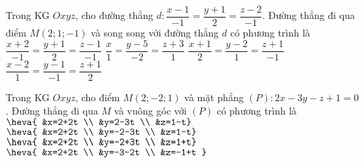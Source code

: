 \begin{ex}%
	Trong KG $Oxyz$, cho đường thẳng $d\colon \dfrac{x-1}{-1}=\dfrac{y+1}{2}=\dfrac{z-2}{-1}$. Đường thẳng đi qua điểm $M(2; 1;-1)$ và song song với đường thẳng $d$ có phương trình là
	\choice
	{$\dfrac{x+2}{-1}=\dfrac{y+1}{2}=\dfrac{z-1}{-1}$}
	{\True $\dfrac{x}{1}=\dfrac{y-5}{-2}=\dfrac{z+3}{1}$}
	{$\dfrac{x+1}{2}=\dfrac{y-2}{1}=\dfrac{z+1}{-1}$}
	{$\dfrac{x-2}{1}=\dfrac{y-1}{-1}=\dfrac{z+1}{2}$}
\end{ex}
\begin{ex}%
	Trong KG $Oxyz$, cho điểm $M(2;-2; 1)$ và mặt phẳng $(P)\colon 2x-3y-z+1=0$. Đường thẳng đi qua $M$ và vuông góc với $(P)$ có phương trình là
	\choice
	{$\heva{	&x=2+2t \\
			&y=2-3t \\
			&z=1-t}$}
	{\True $\heva{	&x=2+2t \\
			&y=-2-3t \\
			&z=1-t}$}
	{$\heva{	&x=2+2t \\
			&y=-2+3t \\
			&z=1+t}$}
	{$\heva{	&x=2+2t \\
			&y=-3-2t \\
			&z=-1+t	}$}
\end{ex}
